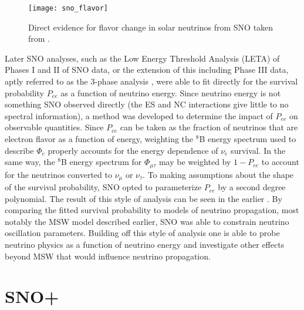 \begin{figure}
\centering
\texttt{[image: sno\_flavor]}
\caption{\label{fig:sno_flavor} Direct evidence for flavor change in solar neutrinos from SNO taken from \cite{sno_direct}.}
\end{figure}

Later SNO analyses, such as the Low Energy Threshold Analysis (LETA) \cite{leta} of Phases I and II of SNO data, or the extension of this including Phase III data, aptly referred to as the 3-phase analysis \cite{3phase}, were able to fit directly for the survival probability $P_{ee}$ as a function of neutrino energy.
Since neutrino energy is not something SNO observed directly (the ES and NC interactions give little to no spectral information), a method was developed to determine the impact of $P_{ee}$ on observable quantities.
Since $P_{ee}$ can be taken as the fraction of neutrinos that are electron flavor as a function of energy, weighting the $^8$B energy spectrum used to describe $\Phi_e$ properly accounts for the energy dependence of $\nu_e$ survival.
In the same way, the $^8$B energy spectrum for $\Phi_{\mu\tau}$ may be weighted by $1-P_{ee}$ to account for the neutrinos converted to $\nu_\mu$ or $\nu_\tau$.
To making assumptions about the shape of the survival probability, SNO opted to parameterize $P_{ee}$ by a second degree polynomial.
The result of this style of analysis can be seen in the earlier .
By comparing the fitted survival probability to models of neutrino propagation, most notably the MSW model described earlier, SNO was able to constrain neutrino oscillation parameters.
Building off this style of analysis one is able to probe neutrino physics as a function of neutrino energy and investigate other effects beyond MSW that would influence neutrino propagation.

\section{SNO+}

